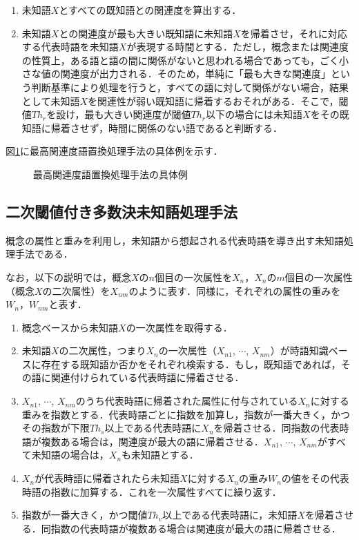 \renewcommand{\labelenumi}{}

\begin{enumerate}
\item 未知語$X$とすべての既知語との関連度を算出する．

\item 未知語$X$との関連度が最も大きい既知語に未知語$X$を帰着させ，それに対応する代表時語を未知語$X$が表現する時間とする．ただし，概念または関連度の性質上，ある語と語の間に関係がないと思われる場合であっても，ごく小さな値の関連度が出力される．そのため，単純に「最も大きな関連度」という判断基準により処理を行うと，すべての語に対して関係がない場合，結果として未知語$X$を関連性が弱い既知語に帰着するおそれがある．そこで，閾値$Th_r$を設け，最も大きい関連度が閾値$Th_r$以下の場合には未知語$X$をその既知語に帰着させず，時間に関係のない語であると判断する．
\end{enumerate}

図\ref{max_association}に最高関連度語置換処理手法の具体例を示す．

\begin{figure}[t]
\caption{最高関連度語置換処理手法の具体例}
\label{max_association}
\end{figure}


\subsection{二次閾値付き多数決未知語処理手法}\label{second_processing}
概念の属性と重みを利用し，未知語から想起される代表時語を導き出す未知語処理手法である．

なお，以下の説明では，概念$X$の$n$個目の一次属性を$X_n$，$X_n$の$m$個目の一次属性（概念$X$の二次属性）を$X_{nm}$のように表す．同様に，それぞれの属性の重みを$W_n$，$W_{nm}$と表す．

\begin{enumerate}
\item 概念ベースから未知語$X$の一次属性を取得する．

\item 未知語$X$の二次属性，つまり$X_n$の一次属性（$X_{n1}$, $\cdots$, $X_{nm}$）が時語知識ベースに存在する既知語か否かをそれぞれ検索する．もし，既知語であれば，その語に関連付けられている代表時語に帰着させる．

\item $X_{n1}$, $\cdots$, $X_{nm}$のうち代表時語に帰着された属性に付与されている$X_n$に対する重みを指数とする．代表時語ごとに指数を加算し，指数が一番大きく，かつその指数が下限$Th_s$以上である代表時語に$X_n$を帰着させる．同指数の代表時語が複数ある場合は，関連度が最大の語に帰着させる．$X_{n1}$, $\cdots$, $X_{nm}$がすべて未知語の場合は，$X_n$も未知語とする．

\item $X_n$が代表時語に帰着されたら未知語$X$に対する$X_n$の重み$W_n$の値をその代表時語の指数に加算する．これを一次属性すべてに繰り返す．

\item 指数が一番大きく，かつ閾値$Th_v$以上である代表時語に，未知語$X$を帰着させる．同指数の代表時語が複数ある場合は関連度が最大の語に帰着させる．
\end{enumerate}


